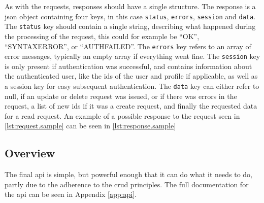 As with the requests, responses should have a single structure. The response is a \ac{json} object containing four keys, in this
case \texttt{status}, \texttt{errors}, \texttt{session} and \texttt{data}. The \texttt{status} key should contain a single string, describing what happened during the
processing of the request, this could for example be ``OK'', ``SYNTAXERROR'', or ``AUTHFAILED''. The \texttt{errors} key refers to an array of error
messages, typically an empty array if everything went fine. The \texttt{session} key is only present if authentication was successful, and contains information
about the authenticated user, like the ids of the user and profile if applicable, as well as a session key for easy subsequent authentication.  The \texttt{data} key
can either refer to null, if an update or delete request was issued, or if there was errors in the request, a list of new ids if it was a create request, and finally
the requested data for a read request. An example of a possible response to the request seen in \autoref{lst:request.sample} can be seen in \autoref{lst:response.sample}



\subsection{Overview}

The final \ac{api} is simple, but powerful enough that it can do what it needs to do, partly due to the adherence to the \ac{crud} principles. The full
documentation for the \ac{api} can be seen in Appendix \autoref{app:api}.
